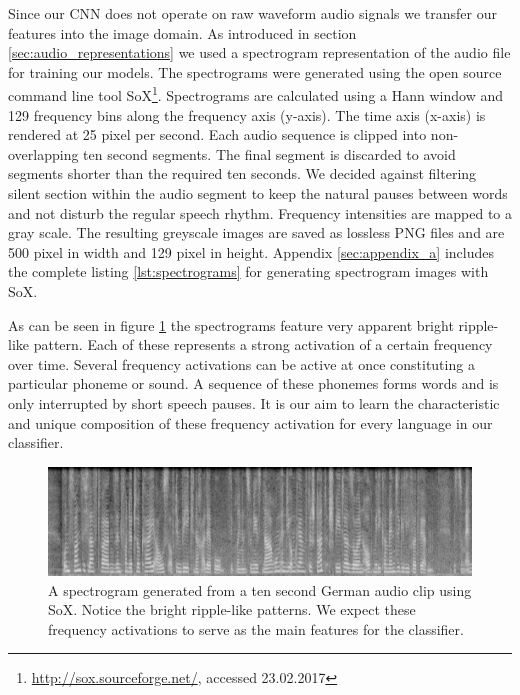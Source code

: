 	Since our CNN does not operate on raw waveform audio signals we transfer our features into the image domain. As introduced in section \ref{sec:audio_representations} we used a spectrogram representation of the audio file for training our models. The spectrograms were generated using the open source command line tool SoX\footnote{\url{http://sox.sourceforge.net/}, accessed 23.02.2017}. Spectrograms are calculated using a Hann window and 129 frequency bins along the frequency axis (y-axis). The time axis (x-axis) is rendered at 25 pixel per second. Each audio sequence is clipped into non-overlapping ten second segments. The  final segment is discarded to avoid segments shorter than the required ten seconds. We decided against filtering silent section within the audio segment to keep the natural pauses between words and not disturb the regular speech rhythm. Frequency intensities are mapped to a gray scale. The resulting greyscale images are saved as lossless PNG files and are 500 pixel in width and 129 pixel in height. Appendix \ref{sec:appendix_a} includes the complete listing \ref{lst:spectrograms} for generating spectrogram images with SoX.
	
	As can be seen in figure \ref{fig:spectrogram} the spectrograms feature very apparent bright ripple-like pattern. Each of these represents a strong activation of a certain frequency over time. Several frequency activations can be active at once constituting a particular phoneme or sound. A sequence of these phonemes forms words and is only interrupted by short speech pauses. It is our aim to learn the characteristic and unique composition of these frequency activation for every language in our classifier. 

	
	\begin{figure}[h]
  		\centering
    	\includegraphics[width=\textwidth,keepaspectratio]{img/spectrogram.png}
    	\caption{A spectrogram generated from a ten second German audio clip  using SoX. Notice the bright ripple-like patterns. We expect these frequency activations to serve as the main features for the classifier.}
    	\label{fig:spectrogram}
	\end{figure}
	


